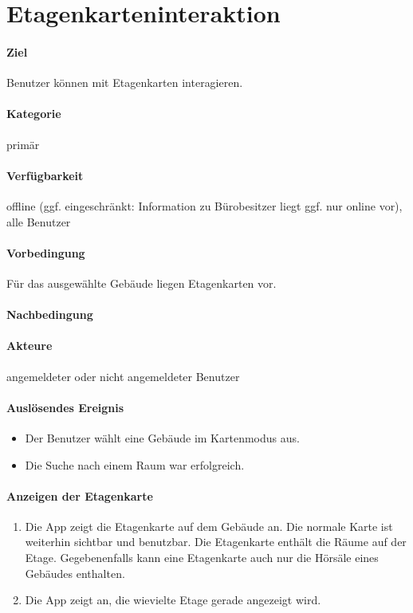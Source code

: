 \section{Etagenkarteninteraktion}
\paragraph{Ziel}
Benutzer können mit Etagenkarten interagieren.
\paragraph{Kategorie}
primär
\paragraph{Verfügbarkeit}
offline (ggf. eingeschränkt: Information zu Bürobesitzer liegt ggf. nur online vor), alle Benutzer
\paragraph{Vorbedingung}
Für das ausgewählte Gebäude liegen Etagenkarten vor.
\paragraph{Nachbedingung}

\paragraph{Akteure}
angemeldeter oder nicht angemeldeter Benutzer
\paragraph{Auslösendes Ereignis}
\begin{itemize}
    \item Der Benutzer wählt eine Gebäude im Kartenmodus aus.
    \item Die Suche nach einem Raum war erfolgreich.
\end{itemize}
 
\paragraph{Anzeigen der Etagenkarte}
\begin{enumerate}
    \item Die App zeigt die Etagenkarte auf dem Gebäude an. Die normale Karte ist weiterhin sichtbar und benutzbar. Die Etagenkarte enthält die Räume auf der Etage. Gegebenenfalls kann eine Etagenkarte auch nur die Hörsäle eines Gebäudes enthalten.
    \item Die App zeigt an, die wievielte Etage gerade angezeigt wird.
\end{enumerate}
